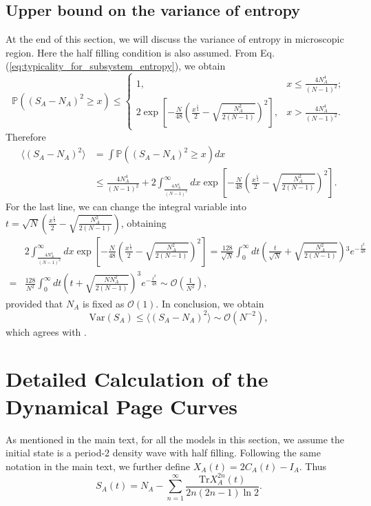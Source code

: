 \documentclass[aps,onecolumn,nofootinbib,superscriptaddress,notitlepage,longbibliography]{revtex4-1}
\def \Tr {\mathrm{Tr}}
\begin{document}
\subsection{Upper bound on the variance of entropy}

At the end of this section, we will discuss the variance of entropy
in microscopic region. Here the half filling condition is also assumed.
From Eq. (\ref{eq:typicality_for_subsystem_entropy}), we obtain
\[
\mathbb{P}((S_A-N_{A})^{2}\geq x)\leq\begin{cases}
1, & x\leq\frac{4N_{A}^{4}}{(N-1)^{2}};\\
2\exp\left[-\frac{N}{48}\left(\frac{x^{\frac{1}{4}}}{2}-\sqrt{\frac{N_{A}^{2}}{2(N-1)}}\right)^{2}\right], & x>\frac{4N_{A}^{4}}{(N-1)^{2}}.
\end{cases}
\]
Therefore
\begin{align*}
\langle(S_A-N_{A})^{2}\rangle & =\int\mathbb{P}((S_A-N_{A})^{2}\geq x)dx\\
 & \leq\frac{4N_{A}^{4}}{(N-1)^{2}}+2\int_{\frac{4N_{A}^{4}}{(N-1)^{2}}}^{\infty}dx\exp\left[-\frac{N}{48}\left(\frac{x^{\frac{1}{4}}}{2}-\sqrt{\frac{N_{A}^{2}}{2(N-1)}}\right)^{2}\right].
\end{align*}
For the last line, we can change the integral variable into $t=\sqrt{N}\left(\frac{x^{\frac{1}{4}}}{2}-\sqrt{\frac{N_A^2}{2(N-1)}}\right)$, obtaining
\begin{align*}
 & 2\int_{\frac{4N_{A}^{4}}{(N-1)^{2}}}^{\infty}dx\exp\left[-\frac{N}{48}\left(\frac{x^{\frac{1}{4}}}{2}-\sqrt{\frac{N_{A}^{2}}{2(N-1)}}\right)^{2}\right]
=  \frac{128}{\sqrt{N}}\int_{0}^{\infty}dt\left(\frac{t}{\sqrt{N}}+\sqrt{\frac{N_{A}^{2}}{2(N-1)}}\right){}^{3}e^{-\frac{t^{2}}{48}}\\
= & \frac{128}{N^{2}}\int_{0}^{\infty}dt\left(t+\sqrt{\frac{NN_{A}^{2}}{2(N-1)}}\right)^{3}e^{-\frac{t^{2}}{48}}
\sim  \mathcal{O}\left(\frac{1}{N^{2}}\right),
\end{align*}
provided that $N_{A}$ is fixed as $\mathcal{O}(1)$. In conclusion, we obtain
\[
\mathrm{Var}(S_A)\leq\langle(S_A-N_{A})^{2}\rangle\sim\mathcal{O}(N^{-2}), %
\]
which agrees with \citep{Bianchi2021,Bianchi2021a}.


\section{Detailed Calculation of the Dynamical %
Page Curves}
As mentioned in the main text, for all the models in this section, we assume the initial state is a period-2 density wave with half filling. Following the same notation in the main text, we further define $X_{A}(t)=2C_{A}(t)-I_{A}$. Thus
\begin{equation}
S_{A}(t)=N_{A}-\sum_{n=1}^{\infty}\frac{\Tr X_{A}^{2n}(t)}{2n(2n-1)\ln2}.
\label{eq:Expanding_of_entropy_with_X}
\end{equation}
\end{document}
